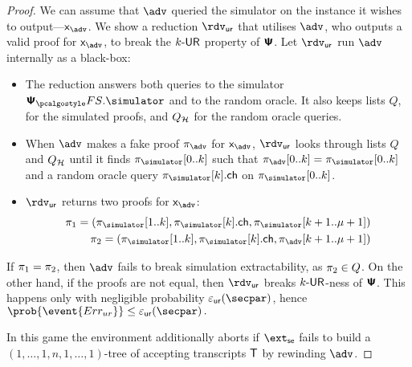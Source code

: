 \begin{proof}
{		We can assume that $\advse$ queried the simulator on the instance it wishes to
		output---$\inp_{\advse}$. We show a reduction $\rdvur$ that utilises $\advse$,
		who outputs a valid proof for $\inp_{\advse}$, to break the ${k\text{-}\mathsf{UR}}$ property of
		$\bm{\mathsf{\Psi}}$. Let $\rdvur$ run $\advse$ internally as a black-box:
		\begin{itemize}
			\item The reduction answers both queries to the simulator $\psfs.\simulator$ and to the random oracle. 
			It also keeps lists $Q$, for the simulated proofs, and $Q_{\mathcal{H}}$ for the random oracle queries. 
			\item When $\advse$ makes a fake proof $\zkproof_{\advse}$ for $\inp_{\advse}$,
			$\rdvur$ looks through lists $Q$ and $Q_{\mathcal{H}}$ until it finds
			$\zkproof_{\simulator}[0..k]$ such that
			$\zkproof_{\advse}[0..k] = \zkproof_{\simulator}[0..k]$
			and a random oracle query $\zkproof_{\simulator}[k].\ch$ on
			$\zkproof_{\simulator}[0..k]$.
			\item $\rdvur$ returns two proofs for $\inp_{\advse}$:
			\begin{align*}
			\zkproof_1 = (\zkproof_{\simulator}[1..k],
			\zkproof_{\simulator}[k].\ch, \zkproof_{\simulator}[k + 1..\mu + 1])\\
			\zkproof_2 = (\zkproof_{\simulator}[1..k],
			\zkproof_{\simulator}[k].\ch, \zkproof_{\advse}[k + 1..\mu + 1])
			\end{align*}
		\end{itemize}  
		If $\pi_1 = \pi_2$, then $\advse$ fails to break simulation
		extractability, as $\pi_2 \in Q$. On the other hand, if the proofs are
		not equal, then $\rdvur$ breaks ${k\text{-}\mathsf{UR}}$-ness of $\bm{\mathsf{\Psi}}$. This happens only with
		negligible probability $\epsur(\secpar)$, hence \( \prob{\event{\errur}} \leq
		\epsur(\secpar)\,. \)
	}
	 In this game the environment additionally aborts if $\extse$ fails to build a
	$(1, \ldots, 1, n, 1, \ldots, 1)$-tree of accepting transcripts $\mathsf{T}$ by rewinding
	$\adv$.
	

\end{proof}
